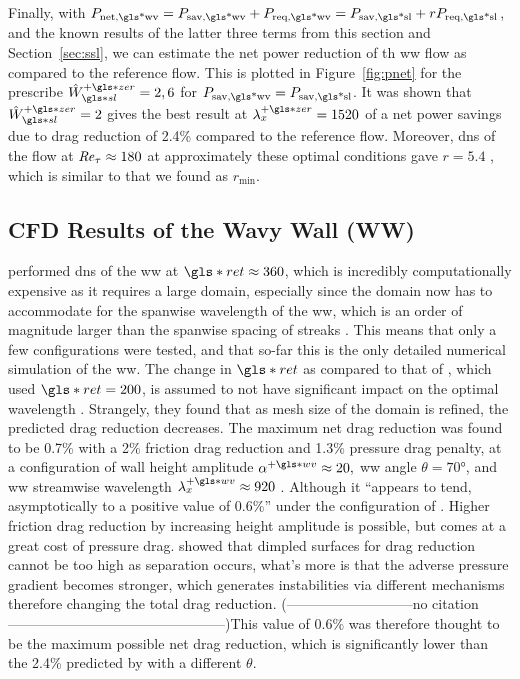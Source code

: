 Finally, with $P_\text{net,\gls*{wv}} = P_\text{sav,\gls*{wv}} +P_\text{req,\gls*{wv}} =P_\text{sav,\gls*{sl}} +rP_\text{req,\gls*{sl}} $, and the known results of the latter three terms from this section and Section~\ref{sec:ssl}, we can estimate the net power reduction of th \gls{ww} flow as compared to the reference flow. This is plotted in Figure~\ref{fig:pnet} for the prescribe $\hat{W}\pz\ssl=2,6$ for $ P_\text{sav,\gls*{wv}}=P_\text{sav,\gls*{sl}} $. It was shown that $\hat{W}\pz\ssl=2$ gives the best result at $\lambda_x\pz=1520$ of a net power savings due to drag reduction of 2.4\% compared to the reference flow. Moreover, \gls{dns} of the flow at $\mbox{\textit{Re}}_{\tau}\approx180$ at approximately these optimal conditions gave $r=5.4$ \cite{ghebali2018}, which is similar to that we found as $r_\text{min} $.


\subsection{CFD Results of the Wavy Wall (WW)}\label{sec:cfdww}
\textcite{ghebali2017} performed \gls{dns} of the \gls{ww} at $ \gls*{ret}\approx360$, which is incredibly computationally expensive as it requires a large domain, especially since the domain now has to accommodate for the spanwise wavelength of the \gls{ww}, which is an order of magnitude larger than the spanwise spacing of streaks \cite{chernyshenko2005}. This means that only a few configurations were tested, and that so-far this is the only detailed numerical simulation of the \gls{ww}. The change in $ \gls*{ret}$ as compared to that of \vqt, which used $ \gls*{ret}=200$, is assumed to not have significant impact on the optimal wavelength \sgc. Strangely, they found that as mesh size of the domain is refined, the predicted drag reduction decreases. The maximum net drag reduction was found to be 0.7\% with a 2\% friction drag reduction and 1.3\% pressure drag penalty, at a configuration of wall height amplitude $\alpha\pw\approx 20,$ \gls{ww} angle  $\theta=\ang{70}$, and \gls{ww} streamwise wavelength $\lambda\pw_x\approx920$ \sgc. Although it ``appears to tend, asymptotically to a positive value of 0.6\%'' under the configuration of \sgc. Higher friction drag reduction by increasing height amplitude is possible, but comes at a great cost of pressure drag. \textcite{vannesselrooij2016} showed that dimpled surfaces for drag reduction cannot be too high as separation occurs, what's more is that the adverse pressure gradient becomes stronger, which generates instabilities via different mechanisms therefore changing the total drag reduction. (---------------------------no citation-----------------------------------------------)This value of 0.6\% was therefore thought to be the maximum possible net drag reduction, which is significantly lower than the 2.4\% predicted by \textcite{chernyshenko2013} with a different $\theta$.

